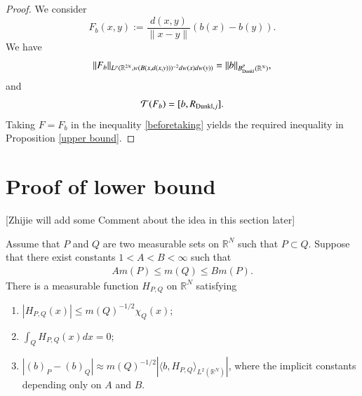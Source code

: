 \documentclass[12pt]{amsart}
\begin{document}
\begin{proof}
We consider
$$F_b(x,y):=\frac{d(x,y)}{\|x-y\|}(b(x)-b(y)).$$ We have  $$\|F_b\|_{L^p(\mathbb{R}^{2N},w(B(x,d(x,y)))^{-2}dw(x)dw(y))}=\|b\|_{B^p_{{\rm Dunkl}}(\mathbb{R}^N)},$$ and
$$\mathcal{T}(F_b)=[b,R_{{\rm Dunkl},j}].$$
Taking $F=F_b$ in the inequality \eqref{beforetaking} yields the required inequality in Proposition \ref{upper bound}.
\end{proof}


\section{Proof of lower bound}
\setcounter{equation}{0}

{\color{red}[Zhijie will add some Comment about the idea in this section later]}
\begin{lemma}\label{constructHPQ}
 Assume that $P$ and $Q$ are two measurable sets on $\mathbb{R}^N$ such that $P\subset Q$. Suppose that there exist constants $1<A<B<\infty$ such that
\begin{align}\label{twosidecond}
  Am(P)\leq m(Q)\leq Bm(P).
\end{align}
There is a measurable  function $H_{P,Q}$ on $\mathbb{R}^N$ satisfying
\begin{enumerate}
  \item\label{111} $|H_{P,Q}(x)|\leq m(Q)^{-1/2}\chi_Q(x)$;\smallskip
  \item\label{222} $\int_Q H_{P,Q}(x)dx=0$;\smallskip
  \item\label{333} $|(b)_P-(b)_Q|\approx m(Q)^{-1/2}|\langle b,H_{P,Q}\rangle_{L^2(\mathbb{R}^N)}|$, where the implicit constants depending only on $A$ and $B$.
\end{enumerate}
\end{lemma}
\end{document}
